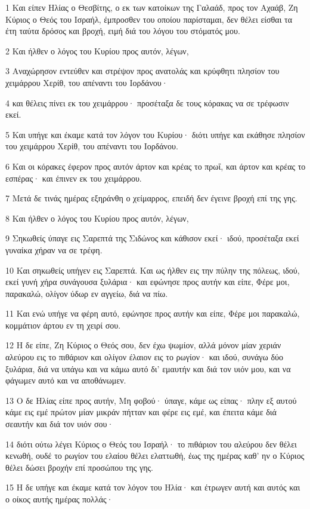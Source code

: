 \par 1 Και είπεν Ηλίας ο Θεσβίτης, ο εκ των κατοίκων της Γαλαάδ, προς τον Αχαάβ, Ζη Κύριος ο Θεός του Ισραήλ, έμπροσθεν του οποίου παρίσταμαι, δεν θέλει είσθαι τα έτη ταύτα δρόσος και βροχή, ειμή διά του λόγου του στόματός μου.
\par 2 Και ήλθεν ο λόγος του Κυρίου προς αυτόν, λέγων,
\par 3 Αναχώρησον εντεύθεν και στρέψον προς ανατολάς και κρύφθητι πλησίον του χειμάρρου Χερίθ, του απέναντι του Ιορδάνου·
\par 4 και θέλεις πίνει εκ του χειμάρρου· προσέταξα δε τους κόρακας να σε τρέφωσιν εκεί.
\par 5 Και υπήγε και έκαμε κατά τον λόγον του Κυρίου· διότι υπήγε και εκάθησε πλησίον του χειμάρρου Χερίθ, του απέναντι του Ιορδάνου.
\par 6 Και οι κόρακες έφερον προς αυτόν άρτον και κρέας το πρωΐ, και άρτον και κρέας το εσπέρας· και έπινεν εκ του χειμάρρου.
\par 7 Μετά δε τινάς ημέρας εξηράνθη ο χείμαρρος, επειδή δεν έγεινε βροχή επί της γης.
\par 8 Και ήλθεν ο λόγος του Κυρίου προς αυτόν, λέγων,
\par 9 Σηκωθείς ύπαγε εις Σαρεπτά της Σιδώνος και κάθισον εκεί· ιδού, προσέταξα εκεί γυναίκα χήραν να σε τρέφη.
\par 10 Και σηκωθείς υπήγεν εις Σαρεπτά. Και ως ήλθεν εις την πύλην της πόλεως, ιδού, εκεί γυνή χήρα συνάγουσα ξυλάρια· και εφώνησε προς αυτήν και είπε, Φέρε μοι, παρακαλώ, ολίγον ύδωρ εν αγγείω, διά να πίω.
\par 11 Και ενώ υπήγε να φέρη αυτό, εφώνησε προς αυτήν και είπε, Φέρε μοι παρακαλώ, κομμάτιον άρτου εν τη χειρί σου.
\par 12 Η δε είπε, Ζη Κύριος ο Θεός σου, δεν έχω ψωμίον, αλλά μόνον μίαν χεριάν αλεύρου εις το πιθάριον και ολίγον έλαιον εις το ρωγίον· και ιδού, συνάγω δύο ξυλάρια, διά να υπάγω και να κάμω αυτό δι' εμαυτήν και διά τον υιόν μου, και να φάγωμεν αυτό και να αποθάνωμεν.
\par 13 Ο δε Ηλίας είπε προς αυτήν, Μη φοβού· ύπαγε, κάμε ως είπας· πλην εξ αυτού κάμε εις εμέ πρώτον μίαν μικράν πήτταν και φέρε εις εμέ, και έπειτα κάμε διά σεαυτήν και διά τον υιόν σου·
\par 14 διότι ούτω λέγει Κύριος ο Θεός του Ισραήλ· το πιθάριον του αλεύρου δεν θέλει κενωθή, ουδέ το ρωγίον του ελαίου θέλει ελαττωθή, έως της ημέρας καθ' ην ο Κύριος θέλει δώσει βροχήν επί προσώπου της γης.
\par 15 Η δε υπήγε και έκαμε κατά τον λόγον του Ηλία· και έτρωγεν αυτή και αυτός και ο οίκος αυτής ημέρας πολλάς·
